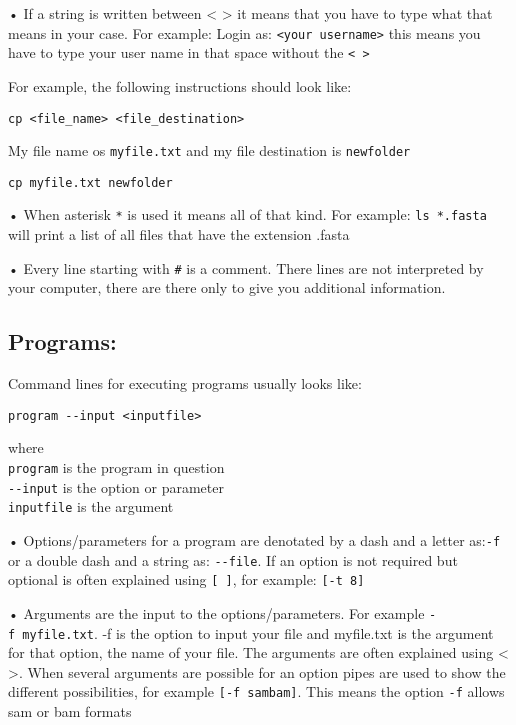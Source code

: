 \documentclass[
]{book}
\begin{document}
• If a string is written between \textless{} \textgreater{} it means that you have to type what that means in your case. For example: Login as: \texttt{\textless{}your\ username\textgreater{}} this means you have to type your user name in that space without the \texttt{\textless{}\ \textgreater{}}

For example, the following instructions should look like:

\begin{verbatim}
cp <file_name> <file_destination>
\end{verbatim}

My file name os \texttt{myfile.txt} and my file destination is \texttt{newfolder}

\begin{verbatim}
cp myfile.txt newfolder
\end{verbatim}

• When asterisk \texttt{*} is used it means all of that kind. For example: \texttt{ls\ *.fasta} will print a list of all files that have the extension .fasta

• Every line starting with \texttt{\#} is a comment. There lines are not interpreted by your computer, there are there only to give you additional information.

\hypertarget{programs}{%
\subsection{Programs:}\label{programs}}

Command lines for executing programs usually looks like:

\begin{verbatim}
program --input <inputfile>
\end{verbatim}

where\\
\texttt{program} is the program in question\\
\texttt{-\/-input} is the option or parameter\\
\texttt{inputfile} is the argument

• Options/parameters for a program are denotated by a dash and a letter as:\texttt{-f} or a double dash and a string as: \texttt{-\/-file}. If an option is not required but optional is often explained using \texttt{{[}\ {]}}, for example: \texttt{{[}-t\ 8{]}}

• Arguments are the input to the options/parameters. For example \texttt{-f\ myfile.txt}. -f is the option to input your file and myfile.txt is the argument for that option, the name of your file. The arguments are often explained using \textless{} \textgreater. When several arguments are possible for an option pipes are used to show the different possibilities, for example \texttt{{[}-f\ sam\textbar{}bam{]}}. This means the option \texttt{-f} allows sam or bam formats
\end{document}
